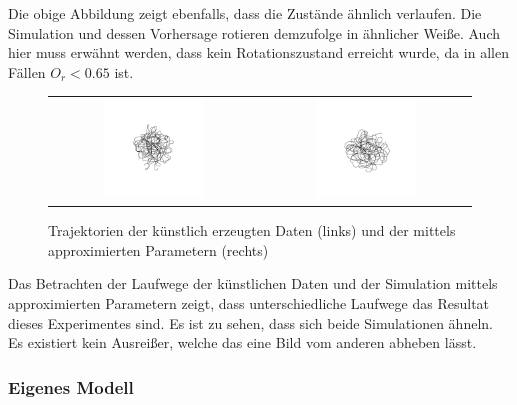 Die obige Abbildung zeigt ebenfalls, dass die Zustände ähnlich verlaufen. Die Simulation und dessen Vorhersage rotieren demzufolge in ähnlicher Weiße. Auch hier muss erwähnt werden, dass kein Rotationszustand erreicht wurde, da in allen Fällen $O_r < 0.65$ ist.


\begin{figure}[H]
\centering
\begin{tabular}{cc}
\includegraphics[width=0.5\textwidth]{figures/Experimente/10Fisch/Boids_sim_fake.png}&
\includegraphics[width=0.5\textwidth]{figures/Experimente/10Fisch/Boids_sim_fake1.png}
\end{tabular}
\caption{Trajektorien der künstlich erzeugten Daten (links) und der mittels approximierten Parametern (rechts) \label{fig:AP}}
\end{figure}

Das Betrachten der Laufwege der künstlichen Daten und der Simulation mittels approximierten Parametern zeigt, dass unterschiedliche Laufwege das Resultat dieses Experimentes sind. Es ist zu sehen, dass sich beide Simulationen ähneln. Es existiert kein Ausreißer, welche das eine Bild vom anderen abheben lässt.



\subsubsection{Eigenes Modell}

